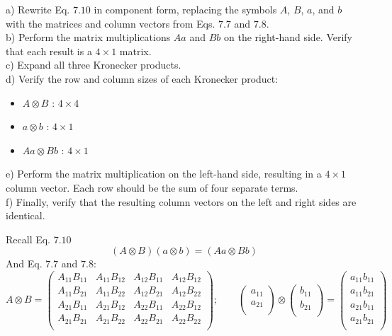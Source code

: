 \documentclass[solutions.tex]{subfiles}
\begin{document}
\maketitle
\begin{exercise} a) Rewrite Eq. $7.10$ in component form,
replacing the symbols $A$, $B$, $a$, and $b$ with the matrices
and column vectors from Eqs. $7.7$ and $7.8$. \\

b) Perform the matrix multiplications $Aa$ and $Bb$ on the
right-hand side. Verify that each result is a $4\times1$ matrix. \\

c) Expand all three Kronecker products. \\

d) Verify the row and column sizes of each Kronecker product:
\begin{itemize}
	\item $A\otimes B$ : $4\times4$
	\item $a\otimes b$ : $4\times1$
	\item $Aa\otimes Bb$ : $4\times 1$
\end{itemize}

e) Perform the matrix multiplication on the left-hand side,
resulting in a $4\times1$ column vector. Each row should be the
sum of four separate terms. \\

f) Finally, verify that the resulting column vectors on the left
and right sides are identical.
\end{exercise}
Recall Eq. $7.10$
\[
	(A\otimes B)(a\otimes b) = (Aa\otimes Bb)
\]
And Eq. $7.7$ and $7.8$:
\[
	A\otimes B = \begin{pmatrix}
		A_{11}B_{11} & A_{11}B_{12} & A_{12}B_{11} & A_{12}B_{12} \\
		A_{11}B_{21} & A_{11}B_{22} & A_{12}B_{21} & A_{12}B_{22} \\
		A_{21}B_{11} & A_{21}B_{12} & A_{22}B_{11} & A_{22}B_{12} \\
		A_{21}B_{21} & A_{21}B_{22} & A_{22}B_{21} & A_{22}B_{22} \\
	\end{pmatrix};\qquad
	\begin{pmatrix}
		a_{11} \\
		a_{21} \\
	\end{pmatrix}\otimes\begin{pmatrix}
		b_{11} \\
		b_{21} \\
	\end{pmatrix} = \begin{pmatrix}
		a_{11}b_{11} \\
		a_{11}b_{21} \\
		a_{21}b_{11} \\
		a_{21}b_{21} \\
	\end{pmatrix}
\]
\end{document}
